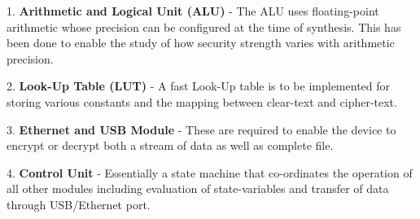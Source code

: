 1. {\bf Arithmetic and Logical Unit (ALU)} - The ALU uses floating-point arithmetic whose precision can be configured at the time of synthesis. This has been done to enable the study of how security strength varies with arithmetic precision.

2. {\bf Look-Up Table (LUT)} - A fast Look-Up table is to be implemented for storing various constants and the mapping between clear-text and cipher-text.

3. {\bf Ethernet and USB Module} - These are required to enable the device to encrypt or decrypt both a stream of data as well as complete file.

4. {\bf Control Unit} - Essentially a state machine that co-ordinates the operation of all other modules including evaluation of state-variables and transfer of data through USB/Ethernet port.

\begin{center}
\end{center}

